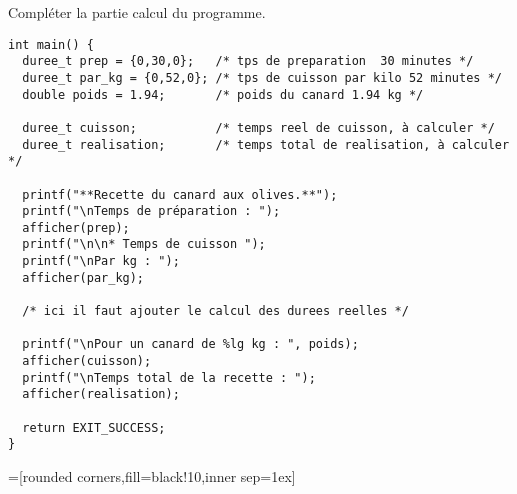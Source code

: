 \question Compléter la partie calcul du programme.
{\begin{small}
\begin{verbatim}
int main() {
  duree_t prep = {0,30,0};   /* tps de preparation  30 minutes */
  duree_t par_kg = {0,52,0}; /* tps de cuisson par kilo 52 minutes */
  double poids = 1.94;       /* poids du canard 1.94 kg */

  duree_t cuisson;           /* temps reel de cuisson, à calculer */
  duree_t realisation;       /* temps total de realisation, à calculer */
  
  printf("**Recette du canard aux olives.**");
  printf("\nTemps de préparation : ");    
  afficher(prep);
  printf("\n\n* Temps de cuisson ");
  printf("\nPar kg : ");
  afficher(par_kg);

  /* ici il faut ajouter le calcul des durees reelles */

  printf("\nPour un canard de %lg kg : ", poids);
  afficher(cuisson);
  printf("\nTemps total de la recette : ");
  afficher(realisation);

  return EXIT_SUCCESS;
}
\end{verbatim}

=[rounded corners,fill=black!10,inner sep=1ex]

~\hfill{}
\end{small}}



